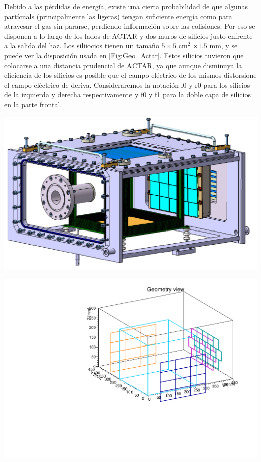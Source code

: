 Debido a las pérdidas de energía, existe una cierta probabilidad de que algunas partícuals (principalmente las ligeras) tengan suficiente energía como para atravesar el gas sin pararse, perdiendo información sobre las colisiones. Por eso se disponen a lo largo de los lados de ACTAR y dos muros de silicios justo enfrente a la salida del haz. Los siliiocios tienen un tamaño $5 \times 5$ cm$^2$ $\times 1.5$ mm, y se puede ver la disposición usada en \cref{Fig:Geo_Actar}. Estos silicios tuvieron que colocarse a una distancia prudencial de ACTAR, ya que aunque disminuya la eficiencia de los silicios es posible que el campo eléctrico de los mismos distorsione el campo eléctrico de deriva. Consideraremos la notación l0 y r0 para los silicios de la izquierda y derecha respectivamente y f0  y f1 para la doble capa de silicios en la parte frontal.

\begin{minipage}{0.48\linewidth} \centering
	\includegraphics[width=1\linewidth]{Imagenes/ACTAR.png}
	\label{Fig:ACTAR}
\end{minipage}
\hfill
\begin{minipage}{0.458\linewidth} \centering
	\includegraphics[width=1\linewidth]{Imagenes/Actar.pdf}
	\label{Fig:Geo_Actar}
\end{minipage}

